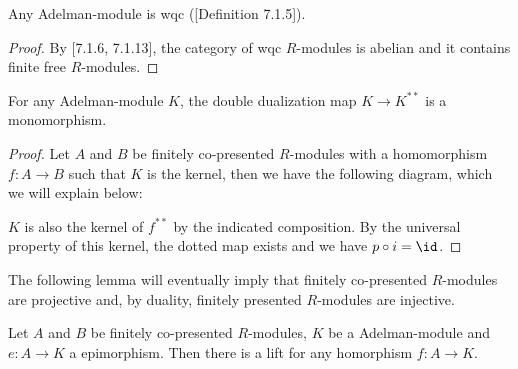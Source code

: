 \begin{remark}
  Any Adelman-module is wqc (\cite{draft}[Definition 7.1.5]).
\end{remark}

\begin{proof}
  By \cite{draft}[7.1.6, 7.1.13], the category of wqc $R$-modules is abelian and it contains finite free $R$-modules.
\end{proof}

\begin{lemma}
  \label{coherent-double-dual-mono}
  For any Adelman-module $K$, the double dualization map $K\to K^{\ast\ast}$ is a monomorphism.
\end{lemma}

\begin{proof}
  Let $A$ and $B$ be finitely co-presented $R$-modules with a homomorphism $f:A\to B$ such that $K$ is the kernel, then we have the following diagram, which we will explain below:
\begin{center}
\end{center}
$K$ is also the kernel of $f^{\ast\ast}$ by the indicated composition.
By the universal property of this kernel, the dotted map exists and we have $p\circ i=\id$.
\end{proof}

The following lemma will eventually imply that finitely co-presented $R$-modules are projective and, by duality, finitely presented $R$-modules are injective.

\begin{lemma}
  \label{maps-into-coherent-lift}
  Let $A$ and $B$ be finitely co-presented $R$-modules, $K$ be a Adelman-module and $e:A\to K$ a epimorphism.
  Then there is a lift for any homorphism $f:A\to K$.
    \begin{center}
    \end{center}
\end{lemma}

